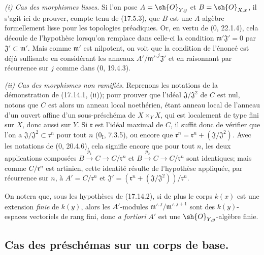 
\emph{(i) Cas des morphismes lisses.} Si l'on pose $A=\sh{O}_{Y,y}$ et $B=\sh{O}_{X,x}$, il s'agit ici de prouver, compte tenu de (17.5.3), que $B$ est une $A$-algèbre formellement lisse pour les topologies préadiques. Or, en vertu de (0, 22.1.4), cela découle de l'hypothèse lorsqu'on remplace dans celle-ci la condition $\mathfrak m'\mathfrak{J}'=0$ par $\mathfrak{J}'\subset\mathfrak m'$. Mais comme $\mathfrak m'$ est nilpotent, on voit que la condition de l'énoncé est déjà suffisante en considérant les anneaux $A'/\mathfrak m'^{,j}\mathfrak{J}'$ et en raisonnant par récurrence sur $j$ comme dans (0, 19.4.3).

\emph{(ii) Cas des morphismes non ramifiés.} Reprenons les notations de la démonstration de (17.14.1, (ii)); pour prouver que l'idéal $\mathfrak{J}/\mathfrak{J}^2$ de $C$ est nul, notons que $C$ est alors un anneau local noethérien, étant anneau local de l'anneau d'un ouvert affine d'un sous-préschéma de $X\times_YX$, qui est localement de type fini sur $X$, donc aussi sur $Y$. Si $\mathfrak r$ est l'idéal maximal de $C$, il suffit donc de vérifier que l'on a $\mathfrak{J}/\mathfrak{J}^2\subset\mathfrak r^n$ pour tout $n$ (0$_{\mathrm I}$, 7.3.5), ou encore que $\mathfrak r^n=\mathfrak r^n+(\mathfrak{J}/\mathfrak{J}^2)$. Avec les notations de (0, 20.4.6), cela signifie encore que pour tout $n$, les deux applications composées $B\xrightarrow{p_1}C\to C/\mathfrak r^n$ et $B\xrightarrow{p_2}C\to C/\mathfrak r^n$ sont identiques; mais comme $C/\mathfrak r^n$ est artinien, cette identité résulte de l'hypothèse appliquée, par récurrence sur $n$, à $A'=C/\mathfrak r^n$ et $\mathfrak{J}'=(\mathfrak r^n+(\mathfrak{J}/\mathfrak{J}^2))/\mathfrak r^n$.

\begin{remark}[17.14.3]
\label{IV.17.14.3}
On notera que, sous les hypothèses de (17.14.2), si de plus le corps $k(x)$ est une extension \emph{finie} de $k(y)$, alors les $A'$-modules $\mathfrak m'^{,j}/\mathfrak m'^{,j+1}$ sont des $k(y)$-espaces vectoriels de rang fini, donc \emph{a fortiori} $A'$ est une $\sh{O}_{Y,y}$-algèbre finie.
\end{remark}

\subsection{Cas des préschémas sur un corps de base.}

